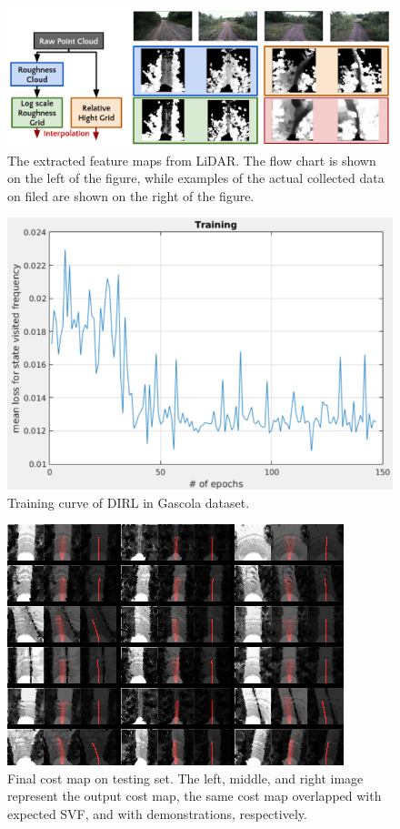 \documentclass[../thesis.tex]{subfiles}
\begin{document}
\begin{figure}[t]
    	\begin{center}
    	 \centerline{\includegraphics[width=\columnwidth]{./DIRL/fig/lidar_feature_map.png}}
           	\caption{The extracted feature maps from LiDAR. The flow chart is shown on the left of the figure, while examples of the actual collected data on filed are shown on the right of the figure.}
           	\label{fig:lidar_feature_map}
    	\end{center}
\end{figure}
 
 
\begin{figure}[t]
    	\begin{center}
    	 \centerline{\includegraphics[width=0.5\columnwidth]{./DIRL/fig/dirl_training_curve.png}}
           	\caption{Training curve of DIRL in Gascola dataset.}
           	\label{fig:dirl_learning_curve}
    	\end{center}
\end{figure}
  
\begin{figure}[t]
    	\begin{center}
    	 \centerline{\includegraphics[width=0.8\columnwidth]{./DIRL/fig/gradtestImg040.png}}
           	\caption{Final cost map on testing set. The left, middle, and right image represent the output cost map, the same cost map overlapped with expected SVF, and with demonstrations, respectively.}
           	\label{fig:final_cost_map}
    	\end{center}
\end{figure}
 
\end{document}
